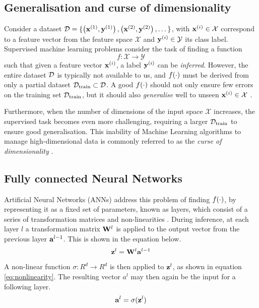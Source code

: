 \subsection{Generalisation and curse of dimensionality}
	Consider a dataset $\mathcal{D} = \{ \left( \mathbf{x}^{(1)}, \mathbf{y}^{(1)} \right), \left( \mathbf{x}^{(2)}, \mathbf{y}^{(2)} \right), \dots \}$, with $\mathbf{x}^{(i)} \in \mathcal{X}$ correspond to a feature vector from the feature space $\mathcal{X}$ and $\mathbf{y}^{(i)} \in \mathcal{Y}$ its class label. Supervised machine learning problems consider the task of finding a function
	$$f: \mathcal{X} \rightarrow \mathcal{Y} \label{eq:fxy} $$
	such that given a feature vector $\mathbf{x}^{(i)}$, a label $\mathbf{y}^{(i)}$ can be \textit{inferred}. However, the entire dataset $\mathcal{D}$ is typically not available to us, and $f(\cdot)$ must be derived from only a partial dataset $\mathcal{D}_{\text{train}} \subset \mathcal{D}$. A good $f(\cdot)$ should not only ensure few errors on the training set $\mathcal{D}_{\text{train}}$, but it should also \textit{generalise} well to unseen $\mathbf{x}^{(i)} \in \mathcal{X}$ \citep{neyshaburExploringGeneralizationDeep2017, chungUnknownExamplesMachine2019, barbieroModelingGeneralizationMachine2020}.

	Furthermore, when the number of dimensions of the input space $\mathcal{X}$ increases, the supervised task becomes even more challenging, requiring a larger $\mathcal{D}_{\text{train}}$ to ensure good generalisation. This inability of Machine Learning algorithms to manage high-dimensional data is commonly referred to as the \textit{curse of dimensionality} \citep{rustUsingRandomizationBreak1997, aremuMachineLearningApproach2020, stuartrussellArtificialIntelligenceModern2022}.
	
\subsection{Fully connected Neural Networks}
		Artificial Neural Networks (ANNs) address this problem of finding $f(\cdot)$, by representing it as a fixed set of parameters, known as layers, which consist of a series of transformation matrices and non-linearities \citep{jainArtificialNeuralNetworks1996, kroghWhatAreArtificial2008, zhangArtificialNeuralNetwork2018}. During inference, at each layer $l$ a transformation matrix $\mathbf{W}^l$ is applied to the output vector from the previous layer $\mathbf{a}^{l-1}$. This is shown in the equation below.
		$$ \mathbf{z}^l = \mathbf{W}^l \mathbf{a}^{l-1} $$
		A non-linear function $\sigma: R^d \rightarrow R^d$ is then applied to $\mathbf{z}^{l}$, as shown in equation \ref{eq:nonlinearity}. The resulting vector $a^l$ may then again be the input for a following layer.
		$$
			\mathbf{a}^l = \sigma(\mathbf{z}^{l})	\label{eq:nonlinearity}
		$$
		
